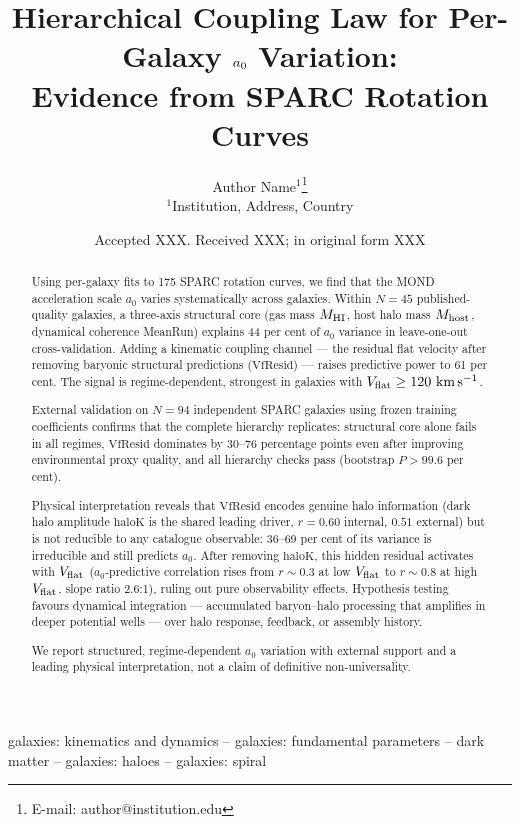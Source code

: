 \documentclass[fleqn,usenatbib]{mnras}
\title[Hierarchical Coupling Law for Per-Galaxy $\azero$ Variation]{Hierarchical Coupling Law for Per-Galaxy $\azero$ Variation:\\ Evidence from SPARC Rotation Curves}
\author[Author(s)]{
Author Name$^{1}$\thanks{E-mail: author@institution.edu}
\\
$^{1}$Institution, Address, Country
}
\date{Accepted XXX. Received XXX; in original form XXX}
\newcommand{\azero}{a_0}
\newcommand{\vflat}{V_{\rm flat}}
\newcommand{\vfresid}{\mathrm{VfResid}}
\newcommand{\haloK}{\mathrm{haloK}}
\newcommand{\mhi}{M_{\rm HI}}
\newcommand{\mhost}{M_{\rm host}}
\newcommand{\kms}{{\rm km\,s^{-1}}}
\begin{document}
\label{firstpage}
\pagerange{\pageref{firstpage}--\pageref{lastpage}}
\maketitle

\begin{abstract}
Using per-galaxy fits to 175 SPARC rotation curves, we find that the MOND
acceleration scale $\azero$ varies systematically across galaxies.
Within $N=45$ published-quality galaxies, a three-axis structural core
(gas mass $\mhi$, host halo mass $\mhost$, dynamical coherence MeanRun)
explains 44 per cent of $\azero$ variance in leave-one-out cross-validation.
Adding a kinematic coupling channel --- the residual flat velocity after
removing baryonic structural predictions ($\vfresid$) --- raises predictive
power to 61 per cent. The signal is regime-dependent, strongest in galaxies
with $\vflat \geq 120~\kms$.

External validation on $N=94$ independent SPARC galaxies using frozen
training coefficients confirms that the complete hierarchy replicates:
structural core alone fails in all regimes, $\vfresid$ dominates by
30--76 percentage points even after improving environmental proxy quality,
and all hierarchy checks pass (bootstrap $P > 99.6$ per cent).

Physical interpretation reveals that $\vfresid$ encodes genuine halo
information (dark halo amplitude $\haloK$ is the shared leading driver,
$r = 0.60$ internal, $0.51$ external) but is not reducible to any catalogue
observable: 36--69 per cent of its variance is irreducible and still
predicts $\azero$. After removing $\haloK$, this hidden residual activates
with $\vflat$ ($\azero$-predictive correlation rises from $r \sim 0.3$ at
low $\vflat$ to $r \sim 0.8$ at high $\vflat$, slope ratio 2.6:1),
ruling out pure observability effects. Hypothesis testing favours dynamical
integration --- accumulated baryon--halo processing that amplifies in deeper
potential wells --- over halo response, feedback, or assembly history.

We report structured, regime-dependent $\azero$ variation with external
support and a leading physical interpretation, not a claim of definitive
non-universality.
\end{abstract}

\begin{keywords}
galaxies: kinematics and dynamics -- galaxies: fundamental parameters -- dark matter -- galaxies: haloes -- galaxies: spiral
\end{keywords}
\end{document}
